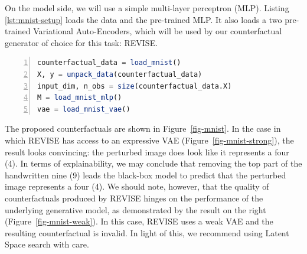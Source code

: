 \documentclass{juliacon}
\begin{document}
On the model side, we will use a simple multi-layer perceptron (MLP).
Listing \ref{lst:mnist-setup} loads the data and the pre-trained MLP. It
also loads a two pre-trained Variational Auto-Encoders, which will be
used by our counterfactual generator of choice for this task: REVISE.

\begin{lstlisting}[language=Julia, escapechar=@, numbers=left, label={lst:mnist-setup}, caption={}]
counterfactual_data = load_mnist()
X, y = unpack_data(counterfactual_data)
input_dim, n_obs = size(counterfactual_data.X)
M = load_mnist_mlp()
vae = load_mnist_vae()
\end{lstlisting}

The proposed counterfactuals are shown in Figure~\ref{fig-mnist}. In the
case in which REVISE has access to an expressive VAE
(Figure~\ref{fig-mnist-strong}), the result looks convincing: the
perturbed image does look like it represents a four (4). In terms of
explainability, we may conclude that removing the top part of the
handwritten nine (9) leads the black-box model to predict that the
perturbed image represents a four (4). We should note, however, that the
quality of counterfactuals produced by REVISE hinges on the performance
of the underlying generative model, as demonstrated by the result on the
right (Figure~\ref{fig-mnist-weak}). In this case, REVISE uses a weak
VAE and the resulting counterfactual is invalid. In light of this, we
recommend using Latent Space search with care.
\end{document}
